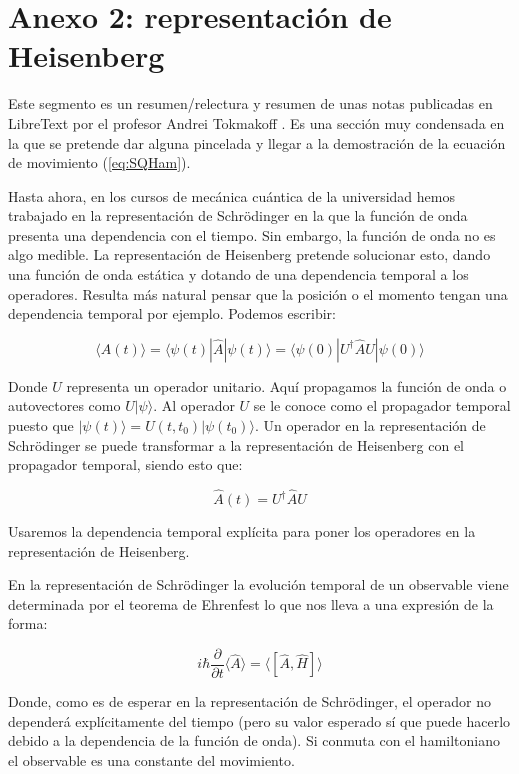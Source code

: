 \documentclass{article} %
\begin{document}
\section{Anexo 2: representación de Heisenberg}

Este segmento es un resumen/relectura y resumen de unas notas publicadas en LibreText por el profesor Andrei Tokmakoff \cite{2020Schrodinger}. Es una sección muy condensada en la que se pretende dar alguna pincelada y llegar a la demostración de la ecuación de movimiento (\ref{eq:SQHam}).

Hasta ahora, en los cursos de mecánica cuántica de la universidad hemos trabajado en la representación de Schrödinger en la que la función de onda presenta una dependencia con el tiempo. Sin embargo, la función de onda no es algo medible. La representación de Heisenberg pretende solucionar esto, dando una función de onda estática y dotando de una dependencia temporal a los operadores. Resulta más natural pensar que la posición o el momento tengan una dependencia temporal por ejemplo. Podemos escribir:

$$
\langle \hat{A}(t) \rangle = \langle \psi(t)|\hat{A}|\psi(t)\rangle = \langle\psi(0)|U^{\dagger}\hat{A}U|\psi(0)\rangle 
$$

Donde $U$ representa un operador unitario. Aquí propagamos la función de onda o autovectores como $U|\psi\rangle$. Al operador $U$ se le conoce como  el propagador temporal puesto que $|\psi(t)\rangle=U(t, t_0)|\psi(t_0)\rangle$. Un operador en la representación de Schrödinger se puede transformar a la representación de Heisenberg con el propagador temporal, siendo esto que:

\begin{equation}
\hat{A}(t) =U^{\dagger}\hat{A}U
\label{eq:HeisenOper}
\end{equation}

Usaremos la dependencia temporal explícita para poner los operadores en la representación de Heisenberg.

En la representación de Schrödinger la evolución temporal de un observable viene determinada por el teorema de Ehrenfest lo que nos lleva a una expresión de la forma:

$$
i\hbar\frac{\partial}{\partial t}\langle\hat{A}\rangle=\langle[\hat{A}, \hat{H}]\rangle
$$

Donde, como es de esperar en la representación de Schrödinger, el operador no dependerá explícitamente del tiempo (pero su valor esperado sí que puede hacerlo debido a la dependencia de la función de onda). Si conmuta con el hamiltoniano  el observable es una constante del movimiento.
\end{document}
